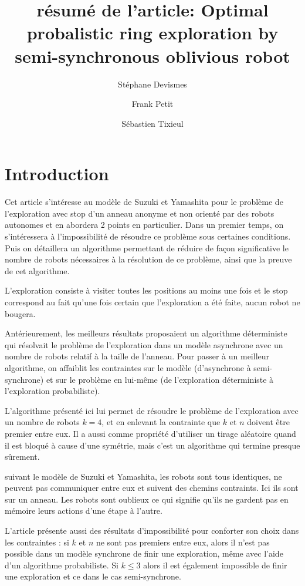 \documentclass[11pt,letter]{../../pactole-git/tex/llncs} %
\begin{document}
\title{résumé de l'article: Optimal probalistic ring exploration by semi-synchronous 
oblivious robot}
 \institute{}
\author{Stéphane Devismes
\and Frank Petit
\and Sébastien Tixieul
}

\maketitle

\section{Introduction}

Cet article s'intéresse au modèle de Suzuki et Yamashita pour le problème de 
l'exploration avec stop d'un anneau anonyme 
et non orienté par des robots autonomes et en abordera 2 points en particulier. Dans un premier
temps, on s'intéressera à l'impossibilité de résoudre ce problème sous certaines conditions.
Puis on détaillera un algorithme permettant de réduire de façon significative le nombre de
robots nécessaires à la résolution de ce problème, ainsi que la preuve de cet algorithme. 

L'exploration consiste à visiter toutes les positions au moins une fois et le stop
correspond au fait qu'une fois certain que l'exploration a été faite, aucun robot ne bougera.

Antérieurement, les meilleurs résultats proposaient un algorithme déterministe qui résolvait 
le problème de l'exploration dans un modèle asynchrone avec un nombre de robots
relatif à la taille de l'anneau.
Pour passer à un meilleur algorithme, on affaiblit les contraintes sur le modèle (d'asynchrone
à semi-synchrone) et sur le problème en lui-même (de l'exploration déterministe à 
l'exploration probabiliste).

L'algorithme présenté ici lui permet de résoudre le problème de l'exploration avec un nombre 
de robots $k=4$, et en enlevant la contrainte que $k$ et $n$ doivent être premier entre eux. 
Il a aussi comme propriété d'utiliser un tirage aléatoire quand il est bloqué à cause d'une 
symétrie, mais c'est un algorithme qui termine presque sûrement.

suivant le modèle de Suzuki et Yamashita, les robots sont tous identiques, 
ne peuvent pas communiquer entre eux
et suivent des chemins contraints. Ici ils sont sur un anneau.
Les robots sont oublieux ce qui signifie qu'ils ne gardent pas en mémoire leurs actions
d'une étape à l'autre.

L'article présente aussi des résultats d'impossibilité pour conforter son choix dans les
contraintes :
si $k$ et $n$ ne sont pas premiers entre eux, alors il n'est pas possible dans un modèle 
synchrone de finir une exploration, même avec l'aide d'un algorithme probabiliste. 
Si $k \le 3$  alors il est également impossible de finir une 
exploration et ce dans le cas semi-synchrone.
\end{document}
